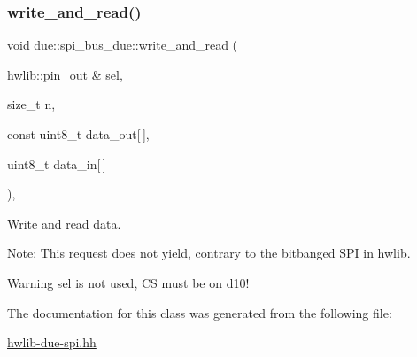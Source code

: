 \subsubsection{\texorpdfstring{write\+\_\+and\+\_\+read()}{write\_and\_read()}}
{\footnotesize\ttfamily void due\+::spi\+\_\+bus\+\_\+due\+::write\+\_\+and\+\_\+read (\begin{DoxyParamCaption}\item[{hwlib\+::pin\+\_\+out \&}]{sel,  }\item[{size\+\_\+t}]{n,  }\item[{const uint8\+\_\+t}]{data\+\_\+out\mbox{[}$\,$\mbox{]},  }\item[{uint8\+\_\+t}]{data\+\_\+in\mbox{[}$\,$\mbox{]} }\end{DoxyParamCaption})\hspace{0.3cm}{\ttfamily [inline]}, {\ttfamily [override]}}



Write and read data. 

Note\+: This request does not yield, contrary to the bitbanged S\+PI in hwlib.

\begin{DoxyWarning}{Warning}
{\ttfamily sel} is not used, CS must be on d10! 
\end{DoxyWarning}


The documentation for this class was generated from the following file\+:\begin{DoxyCompactItemize}
\item 
\hyperlink{hwlib-due-spi_8hh}{hwlib-\/due-\/spi.\+hh}\end{DoxyCompactItemize}
